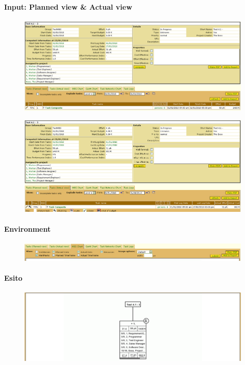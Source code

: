 \paragraph{Input: Planned view & Actual view}
\begin{figure}[h!]
\centering
\includegraphics[width=\textwidth]{tests/TEST_WBS/4.1/4.1_3/Esempio_1/input.png}
\end{figure}
\begin{figure}[h!]
\centering
\includegraphics[width=\textwidth]{tests/TEST_WBS/4.1/4.1_3/Esempio_1/input_actual.png}
\end{figure}
\newpage

\paragraph{Environment}
\begin{figure}
\centering
\includegraphics[width=\textwidth]{tests/TEST_WBS/4.1/4.1_3/Esempio_1/environment.png}
\end{figure}

\paragraph{Esito}
\begin{figure}
\centering
\includegraphics[width=\textwidth]{tests/TEST_WBS/4.1/4.1_3/Esempio_1/output.png}
\end{figure}
\newpage

